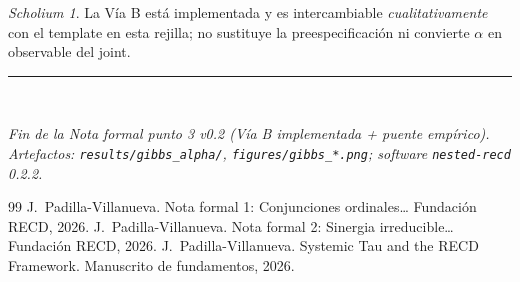 \documentclass[11pt,a4paper]{article}
\theoremstyle{definition}
\theoremstyle{plain}
\theoremstyle{remark}
\newtheorem{scholium}{Scholium}[section]
\begin{document}
\begin{scholium}
La V\'ia B est\'a implementada y es intercambiable \emph{cualitativamente}
con el template en esta rejilla; no sustituye la preespecificaci\'on
ni convierte $\alpha$ en observable del joint.
\end{scholium}

\vspace{1.5em}
\noindent\rule{\textwidth}{0.4pt}\\[0.5em]
\begin{center}
\em Fin de la Nota formal punto 3 v0.2
(V\'ia B implementada + puente emp\'irico).\\
Artefactos: \texttt{results/gibbs\_alpha/},
\texttt{figures/gibbs\_*.png}; software \texttt{nested-recd} 0.2.2.
\end{center}

\begin{thebibliography}{99}
J.~Padilla-Villanueva.
\newblock Nota formal 1: Conjunciones ordinales\ldots
\newblock Fundaci\'on RECD, 2026.
J.~Padilla-Villanueva.
\newblock Nota formal 2: Sinergia irreducible\ldots
\newblock Fundaci\'on RECD, 2026.
J.~Padilla-Villanueva.
\newblock Systemic Tau and the RECD Framework.
\newblock Manuscrito de fundamentos, 2026.
\end{thebibliography}
\end{document}
